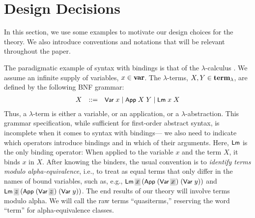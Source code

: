 \documentclass{llncs}
\newcommand\coll[1]{\mbox{\colorbox{light-gray}{$\!#1\!$}}}
\begin{document}
     




\section%
{Design Decisions}
\label{sec-exa}


In this section, we use some examples to motivate our design choices for the theory. 
We also introduce conventions and notations that will be relevant throughout the paper. 


The paradigmatic example of syntax with bindings is %
that of the $\lambda$-calculus \cite{bar-lam}. 
We assume an infinite supply of variables, $x \in \mbox{\bf var}$. The $\lambda$-terms, 
$X,Y \in \mbox{\bf term}_\lambda$, are defined by the following BNF grammar:
%
$$
\begin{array}{lll}
X    &::=& \mbox{\rm\textsf{\small Var}}\;x \mid \mbox{\rm\textsf{\small App}}\;X\;Y  \mid \mbox{\rm\textsf{\small Lm}}\;x\;X
\end{array}
$$
%
Thus, a $\lambda$-term is either %
a variable, or an application, or a $\lambda$-abstraction. 
This grammar specification, while sufficient for first-order abstract syntax, 
is incomplete when it comes to syntax with bindings---%
we also 
need to indicate which %
operators introduce bindings and in which of their arguments. 
Here, $\mbox{\rm\textsf{\small Lm}}$ is the only binding operator: When applied to the variable 
$x$ and the term $X$, it binds $x$ in $X$. 
After knowing the binders, the usual convention is to {\em identify terms modulo alpha-equivalence}, 
i.e., to treat as equal terms that only differ in the names of %
bound variables, %
such as, e.g., 
$\Lm\,\coll{x}\,(\App\;(\Var\,\coll{x})\;(\Var\;y))$ and 
$\Lm\,\coll{z}\,(\App\;(\Var\,\coll{z})\;(\Var\;y))$. %
%
The end results of our theory will involve terms modulo alpha.
We will call the raw terms 
``quasiterms,'' reserving the word ``term'' for alpha-equivalence classes.     
\end{document}
